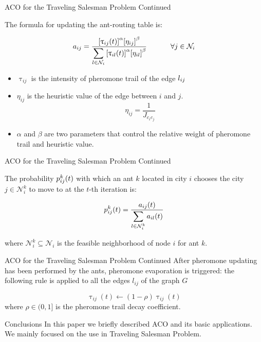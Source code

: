 \documentclass[table]{beamer}
\begin{document}
\begin{frame}{ACO for the Traveling Salesman Problem Continued}
	
	The formula for updating the ant-routing table is:
	
	{\Large $$
		\Large a_{ij} = \frac { {[\uptau_{ij}(t)]}^{\alpha} {[\eta_{ij}]}^{\beta} }
		{\displaystyle\sum_{l \in \mathcal{N}_i} {[\uptau_{il}(t)]}^{\alpha} {[\eta_{il}]}^{\beta} } 
		\ \ \ \ \ \ \ \forall j \in \mathcal{N}_i
		$$}
	
	
	\begin{itemize}
		\item  $ {\uptau_{ij}} $ is the intensity of pheromone trail of the  edge $ 	\mathnormal{l_{ij}} $
		
		\item $ {\eta_{ij}} $ is the heuristic value of the edge between $i$ and $j$.	
		{\Large $$ {\eta_{ij}} = \frac{1}{J_{c_ic_j}} $$ }
		
		\item $\alpha$ and $\beta$ are two parameters that control the relative weight of pheromone trail and heuristic value. 
	\end{itemize}
	
\end{frame}

\begin{frame}{ACO for the Traveling Salesman Problem Continued}
	
	The probability $\mathnormal{p}^{k}_{ij}(t)$ with which an ant $k$ located in city $i$ chooses the city $ j \in \mathcal{N}_i^k $ to move to at the $t$-th  iteration is: 
	
	{\Large 
		$$ \mathnormal{p}^{k}_{ij}(t) = \frac{ {a}_{ij}(t) } 
		{ \displaystyle\sum_{l \in \mathcal{N}_{i}^{k}} a_{il}(t) }
		$$}
	
	where $\mathcal{N}_i^k \subseteq \mathcal{N}_i $ is the feasible neighborhood of node $i$ for ant $k$.
	
\end{frame}

\begin{frame}{ACO for the Traveling Salesman Problem Continued}
	After pheromone updating has been performed by the ants, pheromone evaporation is triggered: the following rule is applied to all the edges $l_{ij}$ of the graph $G$
	
	{\Large
		$$
		\uptau_{ij}(t) \leftarrow (1-\rho)\uptau_{ij}(t)
		$$}\newline
	where $ \rho \in (0,1] $ is the pheromone trail decay coefficient.
\end{frame}

\begin{frame}{Conclusions}
	  In this paper we briefly described ACO and its basic applications. We mainly focused on the use in Traveling Salesman Problem. 
\end{frame}
\end{document}
